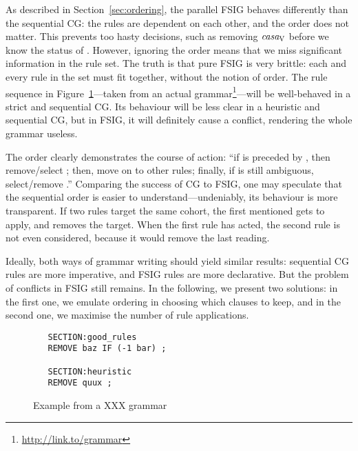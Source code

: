 As described in Section~\ref{sec:ordering}, the parallel FSIG behaves differently than the 
sequential CG: the rules are dependent on each other, and the order does not matter.
This prevents too hasty decisions, such as removing $\text{\em casa}_{\text{\sc V}}$ before we know the status of \la{}. 
However, ignoring the order means that we miss significant information in the rule set. 
The truth is that pure FSIG is very brittle: each and every rule in the set must fit together, without the notion of order. The rule sequence in Figure~\ref{fig:ruleOrder}---taken from an actual grammar\footnote{\url{http://link.to/grammar}}---will be well-behaved in a strict and sequential CG. Its behaviour will be less clear in a heuristic and sequential CG, but in FSIG, it will definitely cause a conflict, rendering the whole grammar useless.



The order clearly demonstrates the course of action: ``if  is preceded by , then remove/select ; then, move on to other rules; finally, if  is still ambiguous, select/remove .'' 
Comparing the success of CG to FSIG, one may speculate that the sequential order is easier to understand---undeniably, its behaviour is more transparent. %
If two rules target the same cohort, the first mentioned gets to apply, and removes the target. When the first rule has acted, the second rule is not even considered, because it would remove the last reading.


Ideally, both ways of grammar writing should yield similar results:
sequential CG rules are more imperative, and FSIG rules are more declarative.
But the problem of conflicts in FSIG still remains. 
In the following, we present two solutions: 
in the first one, we emulate ordering in choosing which clauses to keep, and in the second one, we maximise the number of rule applications. 





\begin{figure}[ht]
\centering
   \begin{verbatim}
   SECTION:good_rules
   REMOVE baz IF (-1 bar) ;

   SECTION:heuristic   
   REMOVE quux ;
   \end{verbatim}
\label{fig:ruleOrder}
\caption{Example from a XXX grammar}
\end{figure}
%





